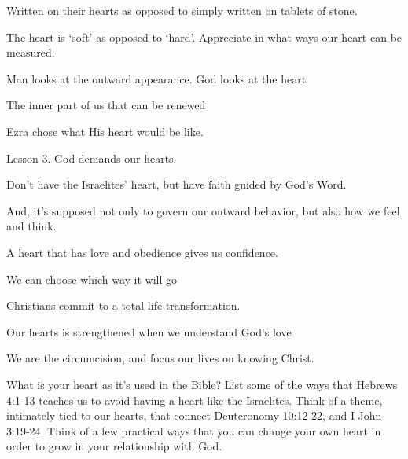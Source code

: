 \begin{discussion}

Written on their hearts as opposed to simply written on tablets of stone.

The heart is `soft' as opposed to `hard'.  Appreciate in what ways our heart can be measured.


 Man looks at the outward appearance.  God looks at the heart

 The inner part of us that can be renewed

 Ezra chose what His heart would be like.

 Lesson 3.  God demands our hearts.


 Don't have the Israelites' heart, but have faith guided by God's Word.

And, it's supposed not only to govern our outward behavior, but also how we feel and think.

 A heart that has love and obedience gives us confidence.\\


 We can choose which way it will go

 Christians commit to a total life transformation.

 Our hearts is strengthened when we understand God's love

 We are the circumcision, and focus our lives on knowing Christ.

\end{discussion}

\begin{questions}
\q What is your heart as it's used in the Bible?
\q List some of the ways that Hebrews 4:1-13 teaches us to avoid having a heart like the Israelites.
\q Think of a theme, intimately tied to our hearts, that connect Deuteronomy 10:12-22, and I John 3:19-24.
\q Think of a few practical ways that you can change your own heart in order to grow in your relationship with God.
\end{questions}